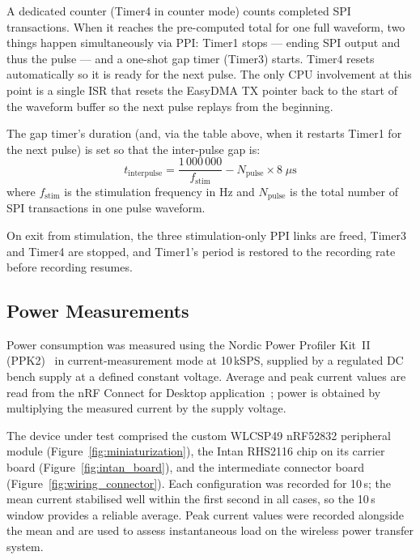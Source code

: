A dedicated counter (Timer4 in counter mode) counts completed SPI
transactions. When it reaches the pre-computed total for one full waveform,
two things happen simultaneously via PPI: Timer1 stops --- ending SPI output
and thus the pulse --- and a one-shot gap timer (Timer3) starts. Timer4
resets automatically so it is ready for the next pulse. The only CPU
involvement at this point is a single ISR that resets the EasyDMA TX pointer
back to the start of the waveform buffer so the next pulse replays from the
beginning.

The gap timer's duration (and, via the table above, when it restarts Timer1 for the
next pulse) is set so that the inter-pulse gap is:
\begin{equation}
    t_{\text{interpulse}} = \frac{1\,000\,000}{f_{\text{stim}}}
    - N_{\text{pulse}} \times 8\;\mu\text{s}
\end{equation}
where $f_{\text{stim}}$ is the stimulation frequency in Hz and $N_{\text{pulse}}$
is the total number of SPI transactions in one pulse waveform.

On exit from stimulation, the three stimulation-only PPI links are freed,
Timer3 and Timer4 are stopped, and Timer1's period is restored to the
recording rate before recording resumes.

\subsection{Power Measurements}

Power consumption was measured using the Nordic Power Profiler Kit~II
(PPK2)~\cite{ppk2} in current-measurement mode at 10\,kSPS, supplied by a regulated
DC bench supply at a defined constant voltage. Average and peak current values are read from
the nRF Connect for Desktop application~\cite{nrf_connect_desktop}; power is
obtained by multiplying the measured current by the supply voltage.

The device under test comprised the custom WLCSP49 nRF52832 peripheral module
(Figure~\ref{fig:miniaturization}), the Intan RHS2116 chip on its carrier board
(Figure~\ref{fig:intan_board}), and the intermediate connector board
(Figure~\ref{fig:wiring_connector}). Each
configuration was recorded for 10\,s; the mean current stabilised well within the
first second in all cases, so the 10\,s window provides a reliable average. Peak
current values were recorded alongside the mean and are used to assess instantaneous
load on the wireless power transfer system.

